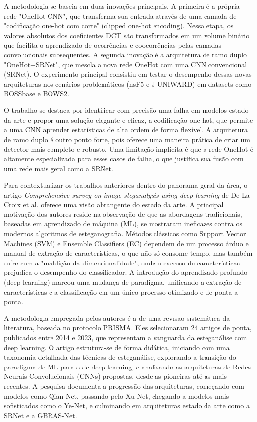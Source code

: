 \documentclass[12pt]{article}
\begin{document}
A metodologia se baseia em duas inovações principais. A primeira é a própria
rede "OneHot CNN", que transforma sua entrada através de uma camada de
"codificação one-hot com corte" (clipped one-hot encoding). Nessa etapa, os
valores absolutos dos coeficientes DCT são transformados em um volume binário
que facilita o aprendizado de ocorrências e coocorrências pelas camadas
convolucionais subsequentes. A segunda inovação é a arquitetura de ramo duplo
"OneHot+SRNet", que mescla a nova rede OneHot com uma CNN convencional (SRNet).
O experimento principal consistiu em testar o desempenho dessas novas
arquiteturas nos cenários problemáticos (nsF5 e J-UNIWARD) em datasets como
BOSSbase e BOWS2.

O trabalho se destaca por identificar com precisão uma falha em modelos estado
da arte e propor uma solução elegante e eficaz, a codificação one-hot, que
permite a uma CNN aprender estatísticas de alta ordem de forma flexível. A
arquitetura de ramo duplo é outro ponto forte, pois oferece uma maneira prática
de criar um detector mais completo e robusto. Uma limitação implícita é que a
rede OneHot é altamente especializada para esses casos de falha, o que
justifica sua fusão com uma rede mais geral como a SRNet.

Para contextualizar os trabalhos anteriores dentro do panorama geral da área, o
artigo \textit{Comprehensive survey on image steganalysis using deep learning}
de De La Croix et al. \cite{LaCroix2024survey} oferece uma visão abrangente do
estado da arte. A principal motivação dos autores reside na observação de que
as abordagens tradicionais, baseadas em aprendizado de máquina (ML), se
mostraram ineficazes contra os modernos algoritmos de esteganografia. Métodos
clássicos como Support Vector Machines (SVM) e Ensemble Classifiers (EC)
dependem de um processo árduo e manual de extração de características, o que
não só consome tempo, mas também sofre com a "maldição da dimensionalidade",
onde o excesso de características prejudica o desempenho do classificador. A
introdução do aprendizado profundo (deep learning) marcou uma mudança de
paradigma, unificando a extração de características e a classificação em um
único processo otimizado e de ponta a ponta.

A metodologia empregada pelos autores é a de uma revisão sistemática da
literatura, baseada no protocolo PRISMA. Eles selecionaram 24 artigos de ponta,
publicados entre 2014 e 2023, que representam a vanguarda da esteganálise com
deep learning. O artigo estrutura-se de forma didática, iniciando com uma
taxonomia detalhada das técnicas de esteganálise, explorando a transição do
paradigma de ML para o de deep learning, e analisando as arquiteturas de Redes
Neurais Convolucionais (CNNs) propostas, desde as pioneiras até as mais
recentes. A pesquisa documenta a progressão das arquiteturas, começando com
modelos como Qian-Net, passando pelo Xu-Net, chegando a modelos mais
sofisticados como o Ye-Net, e culminando em arquiteturas estado da arte como a
SRNet e a GBRAS-Net.
\end{document}
